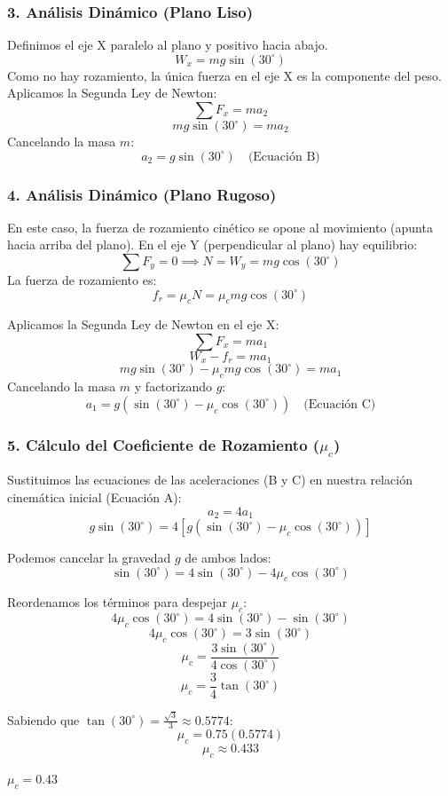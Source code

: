 \documentclass[12pt, a4paper]{article}
\begin{document}
\subsubsection*{3. Análisis Dinámico (Plano Liso)}
Definimos el eje X paralelo al plano y positivo hacia abajo.
$$ W_x = m g \sin(30^\circ) $$
Como no hay rozamiento, la única fuerza en el eje X es la componente del peso. Aplicamos la Segunda Ley de Newton:
$$ \sum F_x = m a_2 $$
$$ m g \sin(30^\circ) = m a_2 $$
Cancelando la masa $m$:
$$ a_2 = g \sin(30^\circ) \quad \text{(Ecuación B)} $$

\subsubsection*{4. Análisis Dinámico (Plano Rugoso)}
En este caso, la fuerza de rozamiento cinético se opone al movimiento (apunta hacia arriba del plano).
En el eje Y (perpendicular al plano) hay equilibrio:
$$ \sum F_y = 0 \implies N = W_y = m g \cos(30^\circ) $$
La fuerza de rozamiento es:
$$ f_r = \mu_c N = \mu_c m g \cos(30^\circ) $$

Aplicamos la Segunda Ley de Newton en el eje X:
$$ \sum F_x = m a_1 $$
$$ W_x - f_r = m a_1 $$
$$ m g \sin(30^\circ) - \mu_c m g \cos(30^\circ) = m a_1 $$
Cancelando la masa $m$ y factorizando $g$:
$$ a_1 = g (\sin(30^\circ) - \mu_c \cos(30^\circ)) \quad \text{(Ecuación C)} $$

\subsubsection*{5. Cálculo del Coeficiente de Rozamiento ($\mu_c$)}
Sustituimos las ecuaciones de las aceleraciones (B y C) en nuestra relación cinemática inicial (Ecuación A):
$$ a_2 = 4 a_1 $$
$$ g \sin(30^\circ) = 4 [ g (\sin(30^\circ) - \mu_c \cos(30^\circ)) ] $$

Podemos cancelar la gravedad $g$ de ambos lados:
$$ \sin(30^\circ) = 4 \sin(30^\circ) - 4 \mu_c \cos(30^\circ) $$

Reordenamos los términos para despejar $\mu_c$:
$$ 4 \mu_c \cos(30^\circ) = 4 \sin(30^\circ) - \sin(30^\circ) $$
$$ 4 \mu_c \cos(30^\circ) = 3 \sin(30^\circ) $$
$$ \mu_c = \frac{3 \sin(30^\circ)}{4 \cos(30^\circ)} $$
$$ \mu_c = \frac{3}{4} \tan(30^\circ) $$

Sabiendo que $\tan(30^\circ) = \frac{\sqrt{3}}{3} \approx 0.5774$:
$$ \mu_c = 0.75 (0.5774) $$
$$ \mu_c \approx 0.433 $$

\begin{tcolorbox}[colback=green!5!white, colframe=green!50!black, title=Respuesta Final]
\centering \Large $\mu_c = 0.43$
\end{tcolorbox}
\end{document}
